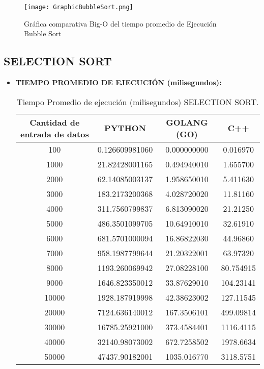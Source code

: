 \documentclass{article}
\begin{document}
    \begin{figure}[H]
    \centering
    \texttt{[image: GraphicBubbleSort.png]}
    \caption{\label{fig:bigOBubbleSort}Gráfica comparativa Big-O del tiempo promedio de Ejecución Bubble Sort}
    \end{figure}

\subsection{SELECTION SORT}
    \begin{itemize}
      \item \textbf{TIEMPO PROMEDIO DE EJECUCIÓN (milisegundos):}
        \begin{table}[H]
            \centering
            \begin{tabular}{||c c c c||} 
              \hline
              \textbf{Cantidad de entrada de datos} & \textbf{PYTHON} & \textbf{GOLANG (GO)} & \textbf{C++} \\ [0.5ex] 
              \hline\hline
              100    &  0.126609981060  &  0.000000000  &  0.016970   \\ [0.5ex]
              1000   &  21.82428001165  &  0.494940010  &  1.655700   \\ [0.5ex]
              2000   &  62.14085003137  &  1.958650010  &  5.411630   \\ [0.5ex]
              3000   &  183.2173200368  &  4.028720020  &  11.81160   \\ [0.5ex]
              4000   &  311.7560799837  &  6.813090020  &  21.21250   \\ [0.5ex]
              5000   &  486.3501099705  &  10.64910010  &  32.61910   \\ [0.5ex]
              6000   &  681.5701000094  &  16.86822030  &  44.96860   \\ [0.5ex]
              7000   &  958.1987799644  &  21.20322001  &  63.97320   \\ [0.5ex]
              8000   &  1193.260069942  &  27.08228100  &  80.754915  \\ [0.5ex]
              9000   &  1646.823350012  &  33.87629010  &  104.23141  \\ [0.5ex]
              10000  &  1928.187919998  &  42.38623002  &  127.11545  \\ [0.5ex]
              20000  &  7124.636140012  &  167.3506101  &  499.09814  \\ [0.5ex]
              30000  &  16785.25921000  &  373.4584401  &  1116.4115  \\ [0.5ex]
              40000  &  32140.98073002  &  672.7258502  &  1978.6634  \\ [0.5ex]
              50000  &  47437.90182001  &  1035.016770  &  3118.5751  \\ [0.5ex]
              \hline
            \end{tabular}
            \caption{Tiempo Promedio de ejecución (milisegundos) SELECTION SORT.}
            \label{table:tiempoPromedioSelectionSort}
        \end{table}


\end{itemize}
\end{document}
